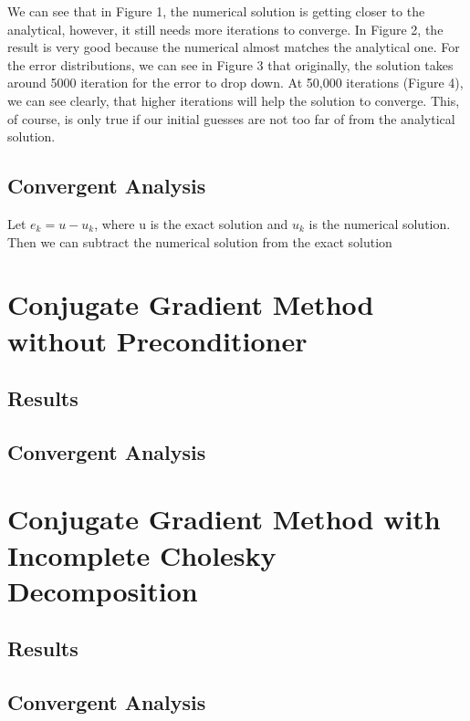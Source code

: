 \documentclass{article}
\begin{document}
	\noindent
	We can see that in Figure 1, the numerical solution is getting closer to the analytical, however, it still needs more iterations to converge. In Figure 2, the result is very good because the numerical almost matches the analytical one. For the error distributions, we can see in Figure 3 that originally, the solution takes around 5000 iteration for the error to drop down.  At 50,000 iterations (Figure 4), we can see clearly, that higher iterations will help the solution to converge. This, of course, is only true if our initial guesses are not too far of from the analytical solution.
	
	  	

\subsection{Convergent Analysis}

Let $e_{k} = u - u_k$, where u is the exact solution and $u_k$ is the numerical solution. Then we can subtract the numerical solution from the exact solution  



\section{Conjugate Gradient Method without Preconditioner}



\subsection{Results}
\subsection{Convergent Analysis}
\section{Conjugate Gradient Method with Incomplete Cholesky Decomposition}
\subsection{Results}
\subsection{Convergent Analysis}
\end{document}
